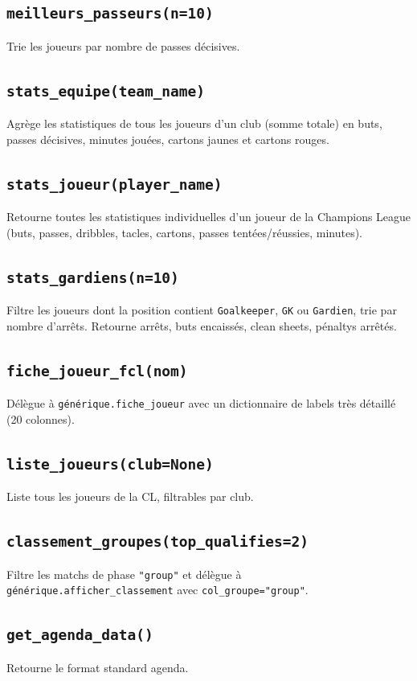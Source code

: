 \documentclass[12pt,a4paper]{article}
\begin{document}
\subsection{\texttt{meilleurs\_passeurs(n=10)}}
Trie les joueurs par nombre de passes décisives.

\subsection{\texttt{stats\_equipe(team\_name)}}
Agrège les statistiques de tous les joueurs d'un club (somme totale) en
buts, passes décisives, minutes jouées, cartons jaunes et cartons rouges.

\subsection{\texttt{stats\_joueur(player\_name)}}
Retourne toutes les statistiques individuelles d'un joueur de la Champions
League (buts, passes, dribbles, tacles, cartons, passes tentées/réussies,
minutes).

\subsection{\texttt{stats\_gardiens(n=10)}}
Filtre les joueurs dont la position contient \texttt{Goalkeeper},
\texttt{GK} ou \texttt{Gardien}, trie par nombre d'arrêts. Retourne arrêts,
buts encaissés, clean sheets, pénaltys arrêtés.

\subsection{\texttt{fiche\_joueur\_fcl(nom)}}
Délègue à \texttt{générique.fiche\_joueur} avec un dictionnaire de labels
très détaillé (20 colonnes).

\subsection{\texttt{liste\_joueurs(club=None)}}
Liste tous les joueurs de la CL, filtrables par club.

\subsection{\texttt{classement\_groupes(top\_qualifies=2)}}
Filtre les matchs de phase \texttt{"group"} et délègue à
\texttt{générique.afficher\_classement} avec \texttt{col\_groupe="group"}.

\subsection{\texttt{get\_agenda\_data()}}
Retourne le format standard agenda.
\end{document}
